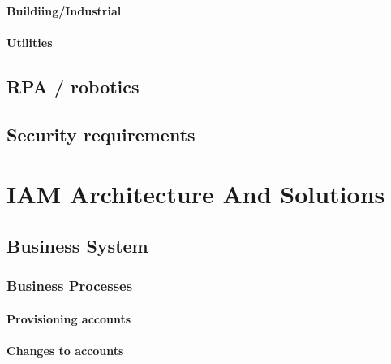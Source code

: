 \hypertarget{buildiingindustrial}{%
\subsubsection{Buildiing/Industrial}\label{buildiingindustrial}}

\hypertarget{utilities}{%
\subsubsection{Utilities}\label{utilities}}

\hypertarget{rpa-robotics}{%
\section{RPA / robotics}\label{rpa-robotics}}

\hypertarget{security-requirements}{%
\section{Security requirements}\label{security-requirements}}

\hypertarget{iam-architecture-and-solutions}{%
\chapter{IAM Architecture And
Solutions}\label{iam-architecture-and-solutions}}

\hypertarget{business-system}{%
\section{Business System}\label{business-system}}

\hypertarget{business-processes}{%
\subsection{Business Processes}\label{business-processes}}

\hypertarget{provisioning-accounts}{%
\subsubsection{Provisioning accounts}\label{provisioning-accounts}}

\hypertarget{changes-to-accounts}{%
\subsubsection{Changes to accounts}\label{changes-to-accounts}}

